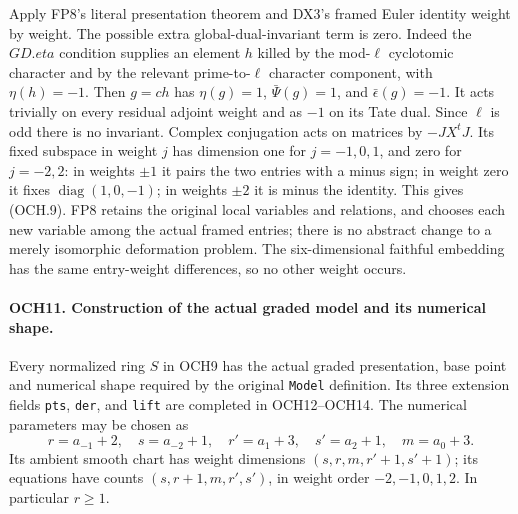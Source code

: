 \documentclass[11pt,a4paper]{article}
\numberwithin{equation}{section}
\theoremstyle{remark}\newtheorem{remark}[theorem]{Remark}
\begin{document}
Apply FP8's literal presentation theorem and DX3's framed Euler
identity weight by weight.  The possible extra global-dual-invariant
term is zero.  Indeed the \(GD.eta\) condition supplies an element
\(h\) killed by the mod-\(\ell\) cyclotomic character and by
the relevant prime-to-\(\ell\) character component, with
\(\eta(h)=-1\).  Then \(g=ch\) has
\(\eta(g)=1\), \(\bar\Psi(g)=1\), and
\(\bar\epsilon(g)=-1\).  It acts trivially on every residual
adjoint weight and as \(-1\) on its Tate dual.  Since \(\ell\)
is odd there is no invariant.  Complex conjugation acts on matrices
by \(-JX^tJ\).  Its fixed subspace in weight \(j\) has
dimension one for \(j=-1,0,1\), and zero for \(j=-2,2\):
in weights \(\pm1\) it pairs the two entries with a minus
sign; in weight zero it fixes \(\operatorname{diag}(1,0,-1)\);
in weights \(\pm2\) it is minus the identity.  This gives
(OCH.9).  FP8 retains the original local variables and relations,
and chooses each new variable among the actual framed entries;
there is no abstract change to a merely isomorphic deformation
problem.  The six-dimensional faithful embedding has the same
entry-weight differences, so no other weight occurs.

\paragraph{OCH11. Construction of the actual graded model and its numerical shape.}
\label{claim:OCH11}
Every normalized ring \(S\) in OCH9 has the actual graded
presentation, base point and numerical shape required by the original
\texttt{Model} definition.  Its three extension fields
\texttt{pts}, \texttt{der}, and \texttt{lift} are completed
in OCH12--OCH14.  The numerical parameters may be chosen as
\[
 r=a_{-1}+2,\quad s=a_{-2}+1,\quad
 r'=a_1+3,\quad s'=a_2+1,\quad m=a_0+3.
 \tag{OCH.10}
\]
Its ambient smooth chart has weight dimensions
\((s,r,m,r'+1,s'+1)\); its equations have counts
\((s,r+1,m,r',s')\), in weight order \(-2,-1,0,1,2\).
In particular \(r\ge1\).
\end{document}

